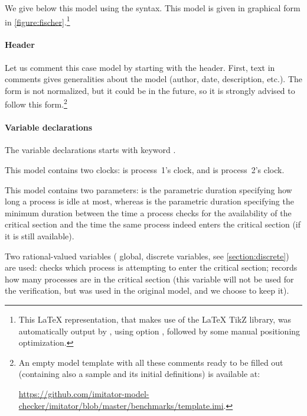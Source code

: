 We give below this model using the \imitator{} syntax.
This model is given in graphical form in \cref{figure:fischer}.\footnote{%
	This \LaTeX{} representation, that makes use of the \LaTeX{} TikZ library, was automatically output by \imitator{}, using option , followed by some manual positioning optimization.
}

\bigskip





\paragraph{Header}
Let us comment this case model by starting with the header.
First, text in comments gives generalities about the model (author, date, description, etc.).
The form is not normalized, but it could be in the future, so it is strongly advised to follow this form.\footnote{%
	An empty model template with all these comments ready to be filled out (containing also a sample \IPTA{} and its initial definitions) is available at:

	\url{https://github.com/imitator-model-checker/imitator/blob/master/benchmarks/template.imi}.
}

\paragraph{Variable declarations}
The variable declarations starts with keyword .

This model contains two clocks:  is process~1's clock, and  is process~2's clock.

This model contains two parameters:  is the parametric duration specifying how long a process is idle at most, whereas  is the parametric duration specifying the minimum duration between the time a process checks for the availability of the critical section and the time the same process indeed enters the critical section (if it is still available).

Two rational-valued variables (\ie{} global, discrete variables, see \cref{section:discrete}) are used:
 checks which process is attempting to enter the critical section;
 records how many processes are in the critical section (this variable will not be used for the verification, but was used in the original \pat{} model, and we choose to keep it).

